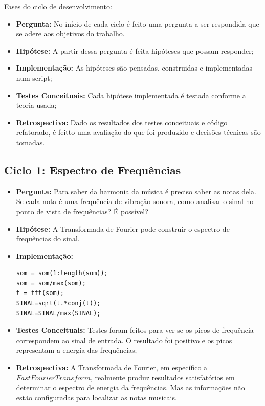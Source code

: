 Fases do ciclo de desenvolvimento:
\begin{itemize}
\item \textbf{Pergunta:} No início de cada ciclo é feito uma pergunta a ser respondida que se adere aos objetivos do trabalho.
\item \textbf{Hipótese:} A partir dessa pergunta é feita hipóteses que possam responder;
\item \textbf{Implementação:} As hipóteses são pensadas, construidas e implementadas num script;
\item \textbf{Testes Conceituais:} Cada hipótese implementada é testada conforme a teoria usada;
\item \textbf{Retrospectiva:} Dado os resultados dos testes conceituais e código refatorado, é feitto uma avaliação do que foi produzido e decisões técnicas são tomadas.
\end{itemize}
  
\subsection{Ciclo 1: Espectro de Frequências}
\label{subsec:ciclo_1}

\begin{itemize}
\item \textbf{Pergunta:} Para saber da harmonia da música é preciso saber as notas dela. Se cada nota é uma frequência de vibração sonora, como analisar o sinal no ponto de vista de frequências? É possível?
\item \textbf{Hipótese:} A Transformada de Fourier pode construir o espectro de frequências do sinal.
\item \textbf{Implementação:} 
\begin{lstlisting}
som = som(1:length(som));
som = som/max(som);
t = fft(som);
SINAL=sqrt(t.*conj(t));
SINAL=SINAL/max(SINAL);
\end{lstlisting}
\item \textbf{Testes Conceituais:} Testes foram feitos para ver se os picos de frequência correspondem ao sinal de entrada. O resultado foi positivo e os picos representam a energia das frequências;
\item \textbf{Retrospectiva:} A Transformada de Fourier, em específico a $Fast Fourier Transform$, realmente produz resultados satisfatórios em determinar o espectro de energia da frequências. Mas as informações não estão configuradas para localizar as notas musicais.
\end{itemize}


